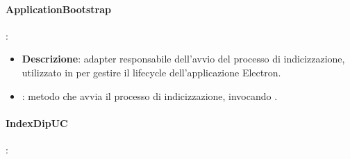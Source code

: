 \paragraph{ApplicationBootstrap}:
\begin{itemize}
    \item \textbf{Descrizione}: adapter responsabile dell'avvio del processo di indicizzazione, utilizzato in  per gestire il lifecycle dell'applicazione Electron.
    \item {}: metodo che avvia il processo di indicizzazione, invocando .
\end{itemize}

\paragraph{IndexDipUC}:
